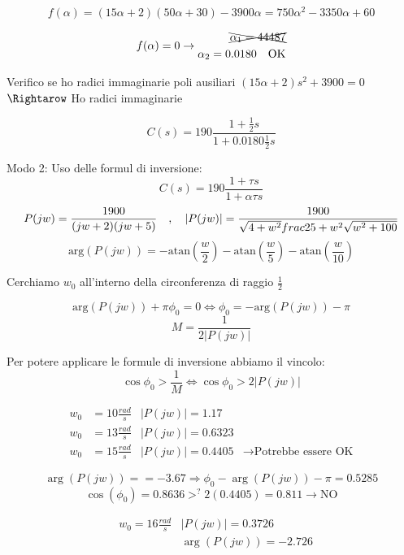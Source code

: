 \documentclass{article}
\begin{document}
\begin{minipage}{0.5\taxtwidth}
    \[ f(\alpha) = (15 \alpha + 2) ( 50 \alpha + 30) - 3900\alpha = 750\alpha^2 - 3350\alpha + 60 \]
\end{minipage}

\[ f(\alpha) = 0
    \rightarrow \begin{split}
        \xcancel{\alpha_1 = 44487}\\
        \alpha_2 = 0.0180 \quad \text{OK}
    \end{split}
\]

Verifico se ho radici immaginarie poli ausiliari $(15 \alpha + 2) s^2 + 3900 = 0$ $\Rightarow$ Ho radici immaginarie

\[C(s) = 190 \frac{1 + \frac{1}{2}s}{1 + 0.0180 \frac{1}{2} s}\]

Modo 2: Uso delle formul di inversione:
\[ C(s) = 190 \frac{1 + \tau s}{1 + \alpha \tau s}\]
\[ P(jw) = \frac{1900}{(jw + 2)(jw+5) } \quad , \quad |P(jw)| = \frac{1900}{\sqrt{4 + w^2}\\frac{25 + w^2}\sqrt{w^2 + 100}} \]
\[ \text{arg}(P(jw)) = - \text{atan}\left(\frac{w}{2}\right) - \text{atan}\left(\frac{w}{5}\right) -\text{atan}\left(\frac{w}{10}\right)\]

Cerchiamo $w_0$ all'interno della circonferenza di raggio $\frac{1}{2}$

\[ \text{arg}(P(jw)) + \pi \phi_0 = 0 \Leftrightarrow \phi_0 = -\text{arg}(P(jw)) -\pi \]
\[ M = \frac{1}{2 |P(jw)|} \]

Per potere applicare le formule di inversione abbiamo il vincolo:
\[ \cos \phi_0 > \frac{1}{M} \Leftrightarrow \cos \phi_0 > 2 |P(jw)| \]

\[
\begin{aligned}
    w_0 &= 10 \frac{rad}{s} & |P(jw)| = 1.17\\
    w_0 &=13 \frac{rad}{s} & |P(jw)| = 0.6323\\
    w_0 &= 15\frac{rad}{s} & |P(jw)| = 0.4405& \rightarrow \text{Potrebbe essere OK}
\end{aligned}
\]

\[ \arg(P(jw)) =  = -3.67 \Rightarrow \phi_0 - \arg(P(jw)) - \pi = 0.5285 \]
\[ \cos (\phi_0) = 0.8636 >^? 2(0.4405) = 0.811 \rightarrow \text{NO}\]


\[
\begin{aligned}
    &w_0 = 16 \frac{rad}{s} & |P(jw)| = 0.3726\\
& & \arg(P(jw)) = -2.726
\end{aligned}
\]
\end{document}

